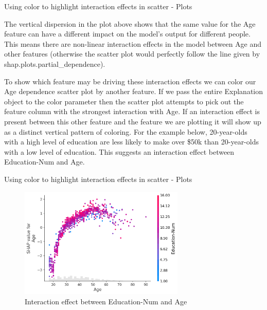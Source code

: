 \documentclass[aspectratio=169]{beamer}
\begin{document}
\begin{frame}{Using color to highlight interaction effects in scatter - Plots}

The vertical dispersion in the plot above shows that the same value for the Age feature can have a different impact on the model’s output for different people. This means there are non-linear interaction effects in the model between Age and other features (otherwise the scatter plot would perfectly follow the line given by shap.plots.partial\_dependence).

To show which feature may be driving these interaction effects we can color our Age dependence scatter plot by another feature. If we pass the entire Explanation object to the color parameter then the scatter plot attempts to pick out the feature column with the strongest interaction with Age. If an interaction effect is present between this other feature and the feature we are plotting it will show up as a distinct vertical pattern of coloring. For the example below, 20-year-olds with a high level of education are less likely to make over \$50k than 20-year-olds with a low level of education. This suggests an interaction effect between Education-Num and Age.
\end{frame}

\begin{frame}{Using color to highlight interaction effects in scatter - Plots}
    \begin{figure}[htbp]
        \centering
        \includegraphics[width=0.7\textwidth]{figs/shap/plots/scatter/example_notebooks_api_examples_plots_scatter_5_0.png}
        \caption{Interaction effect between Education-Num and Age}
        \label{fig:interaction-scatter}
    \end{figure}
\end{frame}
\end{document}
